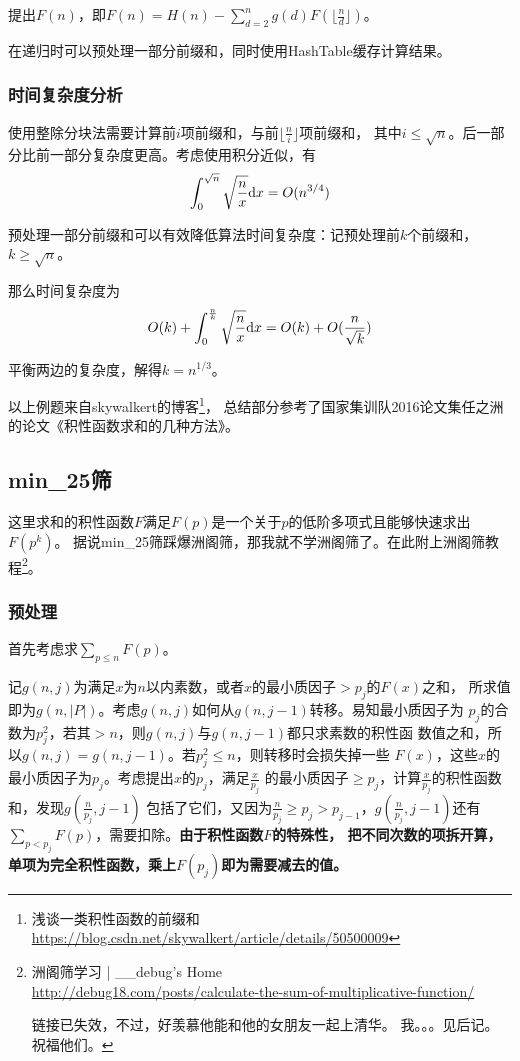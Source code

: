 提出$F(n)$，即$F(n)=H(n)-\displaystyle \sum_{d=2}^n{g(d)F(\lfloor\frac{n}{d}\rfloor)}$。

在递归时可以预处理一部分前缀和，同时使用HashTable缓存计算结果。
\subsubsection{时间复杂度分析}
使用整除分块法需要计算前$i$项前缀和，与前$\lfloor\frac{n}{i} \rfloor$项前缀和，
其中$i\leq \sqrt{n}$。后一部分比前一部分复杂度更高。考虑使用积分近似，有
\begin{displaymath}
    \int_0^{\sqrt{n}}{\sqrt{\frac{n}{x}} \textrm{d} x}=O(n^{3/4})
\end{displaymath}

预处理一部分前缀和可以有效降低算法时间复杂度：记预处理前$k$个前缀和，$k\geq \sqrt{n}$。

那么时间复杂度为
\begin{displaymath}
    O(k)+\int_0^{\frac{n}{k}}{\sqrt{\frac{n}{x}}\textrm{d} x}=O(k)+O(\frac{n}{\sqrt{k}})
\end{displaymath}

平衡两边的复杂度，解得$k=n^{1/3}$。

以上例题来自skywalkert的博客\footnote{浅谈一类积性函数的前缀和
    \url{https://blog.csdn.net/skywalkert/article/details/50500009}}，
总结部分参考了国家集训队2016论文集任之洲的论文《积性函数求和的几种方法》。

\subsection{min\_25筛}
这里求和的积性函数$F$满足$F(p)$是一个关于$p$的低阶多项式且能够快速求出$F(p^k)$。
据说min\_25筛踩爆洲阁筛，那我就不学洲阁筛了。在此附上洲阁筛教程\footnote{
    洲阁筛学习 | \_\_debug's Home\\
    \url{http://debug18.com/posts/calculate-the-sum-of-multiplicative-function/}

    链接已失效，不过，好羡慕他能和他的女朋友一起上清华。
    我。。。见后记。祝福他们。
}。

\subsubsection{预处理}
首先考虑求$\displaystyle \sum_{p\leq n}{F(p)}$。

记$g(n,j)$为满足$x$为$n$以内素数，或者$x$的最小质因子$>p_j$的$F(x)$之和，
所求值即为$g(n,|P|)$。考虑$g(n,j)$如何从$g(n,j-1)$转移。易知最小质因子为
$p_j$的合数为$p_j^2$，若其$>n$，则$g(n,j)$与$g(n,j-1)$都只求素数的积性函
数值之和，所以$g(n,j)=g(n,j-1)$。若$p_j^2\leq n$，则转移时会损失掉一些
$F(x)$，这些$x$的最小质因子为$p_j$。考虑提出$x$的$p_j$，满足$\frac{x}{p_j}$
的最小质因子$\geq p_j$，计算$\frac{x}{p_j}$的积性函数和，发现$g(\frac{n}{p_j},j-1)$
包括了它们，又因为$\frac{n}{p_j}\geq p_j > p_{j-1}$，$g(\frac{n}{p_j},j-1)$还有
$\displaystyle \sum_{p<p_j}F(p)$，需要扣除。{\bfseries 由于积性函数$F$的特殊性，
把不同次数的项拆开算，单项为完全积性函数，乘上$F(p_j)$即为需要减去的值。}

